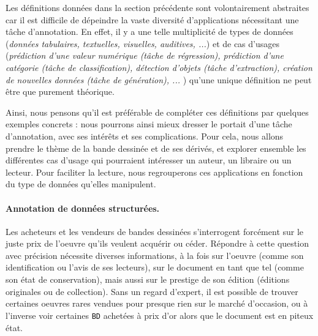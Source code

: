 			Les définitions données dans la section précédente sont volontairement abstraites car il est difficile de dépeindre la vaste diversité d'applications nécessitant une tâche d'annotation.
			En effet, il y a une telle multiplicité de types de données (\textit{données tabulaires, textuelles, visuelles, auditives, ...}) et de cas d'usages (\textit{prédiction d'une valeur numérique (tâche de régression), prédiction d'une catégorie (tâche de classification), détection d'objets (tâche d'extraction), création de nouvelles données (tâche de génération), ... }) qu'une unique définition ne peut être que purement théorique.
			
			Ainsi, nous pensons qu'il est préférable de compléter ces définitions par quelques exemples concrets : nous pourrons ainsi mieux dresser le portait d'une tâche d'annotation, avec ses intérêts et ses complications.
			Pour cela, nous allons prendre le thème de la bande dessinée et de ses dérivés, et explorer ensemble les différentes cas d'usage qui pourraient intéresser un auteur, un libraire ou un lecteur.
			Pour faciliter la lecture, nous regrouperons ces applications en fonction du type de données qu'elles manipulent.
			
			\paragraph{Annotation de données structurées.}
			
				Les acheteurs et les vendeurs de bandes dessinées s'interrogent forcément sur le juste prix de l'oeuvre qu'ils veulent acquérir ou céder.
				Répondre à cette question avec précision nécessite diverses informations, à la fois sur l'oeuvre (comme son identification ou l'avis de ses lecteurs), sur le document en tant que tel (comme son état de conservation), mais aussi sur le prestige de son édition (éditions originales ou de collection).
				Sans un regard d'expert, il est possible de trouver certaines oeuvres rares vendues pour presque rien sur le marché d'occasion, ou à l'inverse voir certaines \texttt{BD} achetées à prix d'or alors que le document est en piteux état.
				
